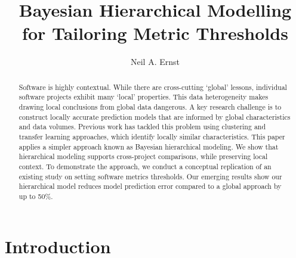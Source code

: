 \documentclass[sigconf,natbib=false]{acmart}
\begin{document}
\title{Bayesian Hierarchical Modelling for Tailoring  Metric Thresholds} %


\author{Neil A. Ernst}

\begin{abstract}
Software is highly contextual. While there are cross-cutting `global' lessons,
individual software projects exhibit many `local' properties. This data
heterogeneity makes drawing local conclusions from global data dangerous.
A key research challenge is to construct locally accurate
prediction models that are informed by global characteristics and data volumes.
Previous work has tackled this problem using clustering and transfer learning
approaches, which identify locally similar characteristics. This paper applies a
simpler approach known as Bayesian hierarchical modeling. We show that
hierarchical modeling supports cross-project comparisons, while preserving local
context. To demonstrate the approach, we conduct a conceptual replication of an
existing study on setting software metrics thresholds. Our emerging results show
our hierarchical model reduces model prediction error compared to a global
approach by up to 50\%.
\end{abstract}

%

\maketitle

\section{Introduction}
\end{document}
